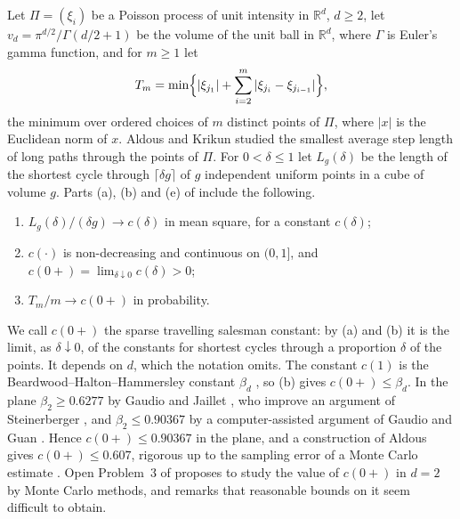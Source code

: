 \documentclass[11pt]{article}
\theoremstyle{remark}
\newcommand{\R}{\mathbb{R}}
\begin{document}
Let $\Pi=(\xi_i)$ be a Poisson process of unit intensity in $\R^d$, $d\ge 2$, let
$v_d=\pi^{d/2}/\Gamma(d/2+1)$ be the volume of the unit ball in $\R^d$, where $\Gamma$ is Euler's gamma function, and for
$m\ge 1$ let
\[
T_m=\min\Bigl\{|\xi_{j_1}|+\sum_{i=2}^{m}|\xi_{j_i}-\xi_{j_{i-1}}|\Bigr\},
\]
the minimum over ordered choices of $m$ distinct points of $\Pi$, where $|x|$ is the Euclidean norm of $x$. Aldous and
Krikun \cite{AK} studied the smallest average step length of long paths through the points of $\Pi$. For $0<\delta\le 1$
let $L_g(\delta)$ be the length of the shortest cycle through $\lceil\delta g\rceil$ of $g$ independent uniform points
in a cube of volume $g$. Parts (a),
(b) and (e) of \cite[Theorem~1]{AK} include the following.
\begin{enumerate}[label=(\alph*)]
\item $L_g(\delta)/(\delta g)\to c(\delta)$ in mean square, for a constant $c(\delta)$;
\item $c(\cdot)$ is non-decreasing and continuous on $(0,1]$, and $c(0+)=\lim_{\delta\downarrow 0}c(\delta)>0$;
\item[(e)] $T_m/m\to c(0+)$ in probability.
\end{enumerate}
We call $c(0+)$ the sparse travelling salesman constant: by (a) and (b) it is the limit, as $\delta\downarrow 0$, of
the constants for shortest cycles through a proportion $\delta$ of the points. It depends on $d$, which the notation
omits. The constant $c(1)$ is the Beardwood--Halton--Hammersley constant $\beta_d$ \cite{BHH}, so (b) gives
$c(0+)\le\beta_d$. In the plane $\beta_2\ge 0.6277$ by Gaudio and Jaillet \cite{GJ}, who improve an
argument of Steinerberger \cite{St}, and $\beta_2\le 0.90367$ by a computer-assisted argument of Gaudio and Guan \cite{GG}. Hence
$c(0+)\le 0.90367$ in the plane, and a construction of Aldous gives $c(0+)\le 0.607$, rigorous
up to the sampling error of a Monte Carlo estimate \cite{Aapp}. Open Problem~3 of \cite{AK} proposes to study the value
of $c(0+)$ in $d=2$ by Monte Carlo methods, and \cite[Section~2.1]{AK} remarks that reasonable bounds on it seem
difficult to obtain.
\end{document}
